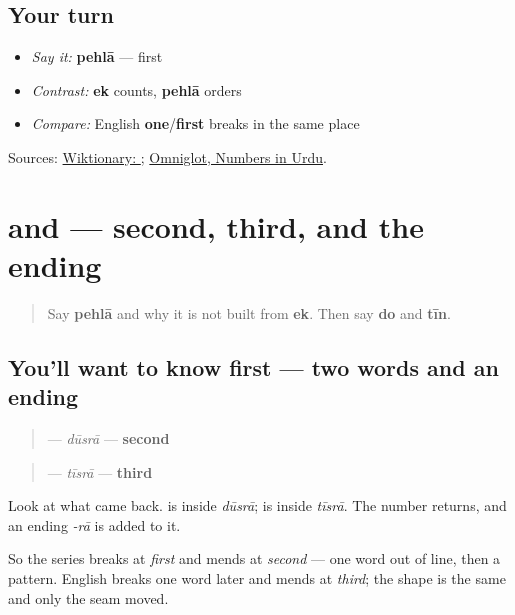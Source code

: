 \subsection*{Your turn}
\begin{itemize}
\raggedright
  \item \emph{Say it:} \textbf{pehlā} — first
  \item \emph{Contrast:} \textbf{ek} counts, \textbf{pehlā} orders
  \item \emph{Compare:} English \textbf{one}/\textbf{first} breaks in the same place
\end{itemize}

\begin{tcolorbox}[breakable,colback=teal!4,colframe=teal!35!black,title={Before you move on}]
Sources: \href{https://en.wiktionary.org/wiki/\%D9\%BE\%DB\%81\%D9\%84\%D8\%A7}{Wiktionary: }; \href{https://www.omniglot.com/language/numbers/urdu.htm}{Omniglot, Numbers in Urdu}.
\end{tcolorbox}
\section[\texorpdfstring{\ur{دوسرا} \ur{تیسرا} (dūsrā tīsrā)}{دوسرا تیسرا (dūsrā tīsrā)}]{ and  — second, third, and the ending}

\label{lesson:UR-C32-dusra-tisra}



\begin{quote}
Say \textbf{pehlā} and why it is not built from \textbf{ek}. Then say \textbf{do} and \textbf{tīn}.
\end{quote}

\subsection*{You'll want to know first — two words and an ending}
\begin{quote}
\textbf{} — \emph{dūsrā} — \textbf{second}
\end{quote}

\begin{quote}
\textbf{} — \emph{tīsrā} — \textbf{third}
\end{quote}

Look at what came back. \textbf{} is inside \emph{dūsrā}; \textbf{} is inside \emph{tīsrā}. The number returns, and an ending \emph{-rā} is added to it.

So the series breaks at \emph{first} and mends at \emph{second} — one word out of line, then a pattern. English breaks one word later and mends at \emph{third}; the shape is the same and only the seam moved.

